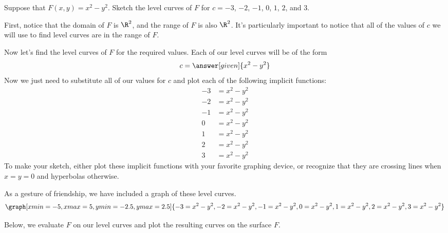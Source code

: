 \documentclass{ximera}
\begin{document}
\begin{example}
  Suppose that $F(x,y) = x^2-y^2$. Sketch the level curves of $F$ for
  $c=-3$, $-2$, $-1$, $0$, $1$, $2$, and $3$.
  \begin{explanation}
    First, notice that the domain of $F$ is $\R^2$, and the range of $F$ is 
    also $\R^2$.   It's particularly important to notice that all 
    of the values of $c$ we will use to find level curves are in the range 
    of $F$.
    
      Now let's find the level curves of $F$ for the required values.
      Each of our level curves will be of the form
      \[
      c = \answer[given]{x^2-y^2}
      \]
      Now we just need to substitute all of our values for $c$ and
      plot each of the following implicit functions:
    \begin{align*}
      -3 &= x^2-y^2\\
      -2 &= x^2-y^2\\
      -1 &= x^2-y^2\\
       0 &= x^2-y^2\\
       1 &= x^2-y^2\\
       2 &= x^2-y^2\\
       3 &= x^2-y^2
    \end{align*}
     To make your sketch, either plot these implicit functions with your favorite
    graphing device, or recognize that they are crossing lines when
    $x=y=0$ and hyperbolas otherwise.
    \begin{onlineOnly}
      As a gesture of friendship, we have included a graph of these
      level curves.
      \[
      \graph[xmin=-5, xmax=5, ymin=-2.5, ymax=2.5]{-3=x^2-y^2,-2=x^2-y^2,-1=x^2-y^2,0=x^2-y^2,1=x^2-y^2,2=x^2-y^2,3=x^2-y^2}
      \]
    \end{onlineOnly}
    Below, we evaluate $F$ on our level curves and plot the resulting 
    curves on the surface $F$.
    \begin{image}
\end{image}
\end{explanation}
\end{example}
\end{document}
